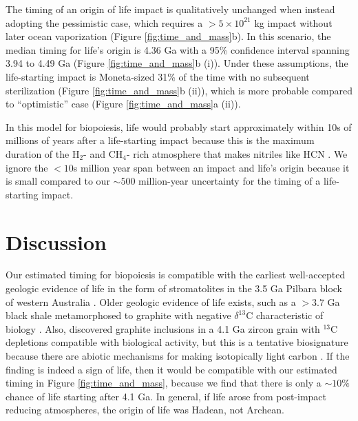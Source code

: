 \documentclass{aastex631}
\begin{document}
The timing of an origin of life impact is qualitatively unchanged when instead adopting the \citet{Wogan_2023} pessimistic case, which requires a $> 5 \times 10^{21}$ kg impact without later ocean vaporization (Figure \ref{fig:time_and_mass}b). In this scenario, the median timing for life's origin is 4.36 Ga with a 95\% confidence interval spanning 3.94 to 4.49 Ga (Figure \ref{fig:time_and_mass}b (i)). Under these assumptions, the life-starting impact is Moneta-sized 31\% of the time with no subsequent sterilization (Figure \ref{fig:time_and_mass}b (ii)), which is more probable compared to ``optimistic'' case (Figure \ref{fig:time_and_mass}a (ii)).

In this model for biopoiesis, life would probably start approximately within 10s of millions of years after a life-starting impact because this is the maximum duration of the H$_2$- and CH$_4$- rich atmosphere that makes nitriles like HCN \citep{Wogan_2023}. We ignore the $< 10$s million year span between an impact and life's origin because it is small compared to our $\sim 500$ million-year uncertainty for the timing of a life-starting impact.

\section{Discussion}

Our estimated timing for biopoiesis is compatible with the earliest well-accepted geologic evidence of life in the form of stromatolites in the 3.5 Ga Pilbara block of western Australia \citep{Walter_1980,Buick_1981,Van_2018}. Older geologic evidence of life exists, such as a $> 3.7$ Ga black shale metamorphosed to graphite with negative $\delta^{13}$C characteristic of biology \citep{Rosing_1999,Ohtomo_2014}. Also, \citet{Bell_2015} discovered graphite inclusions in a 4.1 Ga zircon grain with $^{13}$C depletions compatible with biological activity, but this is a tentative biosignature because there are abiotic mechanisms for making isotopically light carbon \citep{Javaux_2019}. If the \citet{Bell_2015} finding is indeed a sign of life, then it would be compatible with our estimated timing in Figure \ref{fig:time_and_mass}, because we find that there is only a $\sim 10\%$ chance of life starting after 4.1 Ga. In general, if life arose from post-impact reducing atmospheres, the origin of life was Hadean, not Archean.
\end{document}
